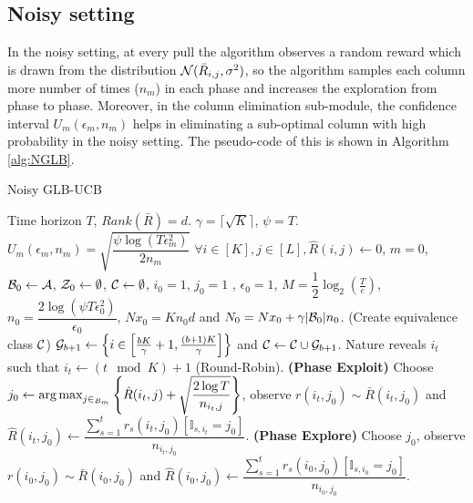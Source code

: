 \subsection{Noisy setting}
\label{alg:noisy}

In the noisy setting, at every pull the algorithm observes a random reward which is drawn from the distribution $\mathcal{N}(\bar{R}_{i,j}, \sigma^2)$, so the algorithm samples each column more number of times ($n_m$) in each phase and increases the exploration from phase to phase. Moreover, in the column elimination sub-module, the confidence interval $U_m(\epsilon_m, n_m)$  helps in eliminating a sub-optimal column with high probability in the noisy setting. The pseudo-code of this is shown in Algorithm \ref{alg:NGLB}.


\begin{algorithm}[!th]
\caption{Noisy GLB-UCB}
\label{alg:NGLB}
\begin{algorithmic}[1]
 Time horizon $T$, $Rank(\bar{R}) = d$.
 $\gamma = \lceil\sqrt{K} \rceil$, $\psi = T$.
 $U_m(\epsilon_m, n_m) = \sqrt{\dfrac{\psi\log(T\epsilon_m^2)}{2n_m} }$
 $\forall i\in [K], j\in [L], \hat{R}(i,j) \leftarrow 0$, $m=0$, $\mathcal{B}_0 \leftarrow \mathcal{A}$, $\mathcal{Z}_0 \leftarrow \emptyset$, $\mathcal{C} \leftarrow \emptyset$,  $i_0=1$, $j_0=1$ , $\epsilon_0 = 1$, $M=\dfrac{1}{2}\log_2\left( \frac{T}{e}\right)$, $n_0 = \dfrac{2\log(\psi T\epsilon_{0}^2)}{\epsilon_{0}} $, $Nx_0 = K n_0 d$ and $N_0 = Nx_0 + \gamma |\mathcal{B}_0|n_0$.
 (Create equivalence class $\mathcal{C}$)
\State  $\mathcal{G}_{b+1}\leftarrow \left\lbrace i\in \left[\frac{bK}{\gamma}+1,\frac{(b+1)K}{\gamma}\right]\right\rbrace$ and $\mathcal{C}\leftarrow \mathcal{C}\cup \mathcal{G}_{b+1}$.
\EndFor
{}	
\State Nature reveals $i_t$ such that $i_t \leftarrow (t \mod K) + 1$ (Round-Robin).
 \textbf{ (Phase Exploit) }
\State Choose $j_0\leftarrow \mathop{\rm arg\,max}_{j\in_{B_m}}\left\lbrace \hat{R}(i_t,j)  + \sqrt{\dfrac{2\log T}{n_{i_t,j}}}\right\rbrace $, observe $r(i_t,j_0)\sim \bar{R}(i_t,j_0)$ and $\hat{R}(i_t,j_0)\leftarrow \dfrac{\sum_{s=1}^{t}r_s(i_t,j_0)[\mathbb{I}_{s,i_t} = j_0]}{n_{i_t,j_0}}$.
 \textbf{ (Phase Explore) }
\State Choose $j_0$, observe $r(i_0,j_0)\sim\bar{R}(i_0,j_0) $ and $\hat{R}(i_0,j_0)\leftarrow \dfrac{\sum_{s=1}^{t}r_s(i_0,j_0)[\mathbb{I}_{s,i_0} = j_0]}{n_{i_0,j_0}}$.

\end{algorithmic}
\end{algorithm}
